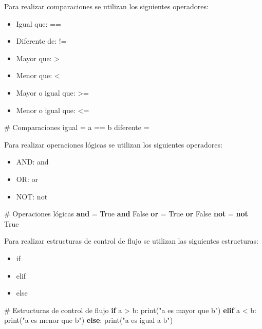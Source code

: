 \documentclass[
  a4paper,
  DIV=11,
  numbers=noendperiod,
  onepage,
  openany]{scrreprt}
\newenvironment{Shaded}{\begin{snugshade}}{\end{snugshade}}
\newcommand{\BuiltInTok}[1]{\textcolor[rgb]{0.00,0.23,0.31}{#1}}
\newcommand{\CommentTok}[1]{\textcolor[rgb]{0.37,0.37,0.37}{#1}}
\newcommand{\ControlFlowTok}[1]{\textcolor[rgb]{0.00,0.23,0.31}{\textbf{#1}}}
\newcommand{\KeywordTok}[1]{\textcolor[rgb]{0.00,0.23,0.31}{\textbf{#1}}}
\newcommand{\NormalTok}[1]{\textcolor[rgb]{0.00,0.23,0.31}{#1}}
\newcommand{\OperatorTok}[1]{\textcolor[rgb]{0.37,0.37,0.37}{#1}}
\newcommand{\StringTok}[1]{\textcolor[rgb]{0.13,0.47,0.30}{#1}}
\newcommand{\VariableTok}[1]{\textcolor[rgb]{0.07,0.07,0.07}{#1}}
\providecommand{\tightlist}{%
  \setlength{\itemsep}{0pt}\setlength{\parskip}{0pt}}\usepackage{longtable,booktabs,array}
\begin{document}
Para realizar comparaciones se utilizan los siguientes operadores:

\begin{itemize}
\tightlist
\item
  Igual que: ==
\item
  Diferente de: !=
\item
  Mayor que: \textgreater{}
\item
  Menor que: \textless{}
\item
  Mayor o igual que: \textgreater=
\item
  Menor o igual que: \textless=
\end{itemize}

\begin{Shaded}
\begin{Highlighting}[]
\CommentTok{\# Comparaciones}
\NormalTok{igual }\OperatorTok{=}\NormalTok{ a }\OperatorTok{==}\NormalTok{ b}
\NormalTok{diferente }\OperatorTok{=}
\end{Highlighting}
\end{Shaded}

Para realizar operaciones lógicas se utilizan los siguientes operadores:

\begin{itemize}
\tightlist
\item
  AND: and
\item
  OR: or
\item
  NOT: not
\end{itemize}

\begin{Shaded}
\begin{Highlighting}[]
\CommentTok{\# Operaciones lógicas}
\KeywordTok{and} \OperatorTok{=} \VariableTok{True} \KeywordTok{and} \VariableTok{False}
\KeywordTok{or} \OperatorTok{=} \VariableTok{True} \KeywordTok{or} \VariableTok{False}
\KeywordTok{not} \OperatorTok{=} \KeywordTok{not} \VariableTok{True}
\end{Highlighting}
\end{Shaded}

Para realizar estructuras de control de flujo se utilizan las siguientes
estructuras:

\begin{itemize}
\tightlist
\item
  if
\item
  elif
\item
  else
\end{itemize}

\begin{Shaded}
\begin{Highlighting}[]
\CommentTok{\# Estructuras de control de flujo}
\ControlFlowTok{if}\NormalTok{ a }\OperatorTok{\textgreater{}}\NormalTok{ b:}
    \BuiltInTok{print}\NormalTok{(}\StringTok{"a es mayor que b"}\NormalTok{)}
\ControlFlowTok{elif}\NormalTok{ a }\OperatorTok{\textless{}}\NormalTok{ b:}
    \BuiltInTok{print}\NormalTok{(}\StringTok{"a es menor que b"}\NormalTok{)}
\ControlFlowTok{else}\NormalTok{:}
    \BuiltInTok{print}\NormalTok{(}\StringTok{"a es igual a b"}\NormalTok{)}
\end{Highlighting}
\end{Shaded}
\end{document}
